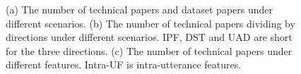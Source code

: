 \begin{figure}[ht]
{\begin{minipage}[t]{0.3\linewidth}
	\label{fig:tech-scenario}
	\end{minipage}}
\caption{(a) The number of technical papers and dataset papers under different scenarios. (b) The number of technical papers dividing by directions under different scenarios. IPF, DST and UAD are short for the three directions. (c) The number of technical papers under different features. Intra-UF is intra-utterance features.}
\end{figure}



